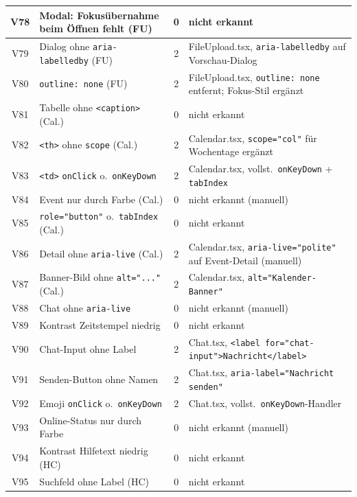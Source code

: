 \begin{longtable}{|c|p{5.0cm}|c|p{5.4cm}|}
V78  & Modal: Fokusübernahme beim Öffnen fehlt (FU)                   & 0 & nicht erkannt \\ \hline
V79  & Dialog ohne \texttt{aria-labelledby} (FU)    & 2 & FileUpload.tsx, \texttt{aria-labelledby} auf Vorschau-Dialog \\ \hline
V80  & \texttt{outline: none} (FU)                  & 2 & FileUpload.tsx, \texttt{outline: none} entfernt; Fokus-Stil ergänzt \\ \hline
V81  & Tabelle ohne \texttt{<caption>} (Cal.)        & 0 & nicht erkannt \\ \hline
V82  & \texttt{<th>} ohne \texttt{scope} (Cal.)     & 2 & Calendar.tsx, \texttt{scope="col"} für Wochentage ergänzt \\ \hline
V83  & \texttt{<td>} \texttt{onClick} o.\ \texttt{onKeyDown} & 2 & Calendar.tsx, vollst.\ \texttt{onKeyDown} + \texttt{tabIndex} \\ \hline
V84  & Event nur durch Farbe (Cal.)                 & 0 & nicht erkannt (manuell) \\ \hline
V85  & \texttt{role="button"} o.\ \texttt{tabIndex} (Cal.) & 0 & nicht erkannt \\ \hline
V86  & Detail ohne \texttt{aria-live} (Cal.)        & 2 & Calendar.tsx, \texttt{aria-live="polite"} auf Event-Detail (manuell) \\ \hline
V87  & Banner-Bild ohne \texttt{alt="..."} (Cal.)         & 2 & Calendar.tsx, \texttt{alt="Kalender-Banner"} \\ \hline
V88  & Chat ohne \texttt{aria-live}                 & 0 & nicht erkannt (manuell) \\ \hline
V89  & Kontrast Zeitstempel niedrig                 & 0 & nicht erkannt \\ \hline
V90  & Chat-Input ohne Label                        & 2 & Chat.tsx, \texttt{<la\-bel for="chat-in\-put">Na\-chricht</la\-bel>} \\ \hline
V91  & Senden-Button ohne Namen                     & 2 & Chat.tsx, \texttt{aria-label="Nachricht senden"} \\ \hline
V92  & Emoji \texttt{onClick} o.\ \texttt{onKeyDown} & 2 & Chat.tsx, vollst.\ \texttt{onKeyDown}-Handler \\ \hline
V93  & Online-Status nur durch Farbe                & 0 & nicht erkannt (manuell) \\ \hline
V94  & Kontrast Hilfetext niedrig (HC)              & 0 & nicht erkannt \\ \hline
V95  & Suchfeld ohne Label (HC)                     & 0 & nicht erkannt \\ \hline

\end{longtable}
